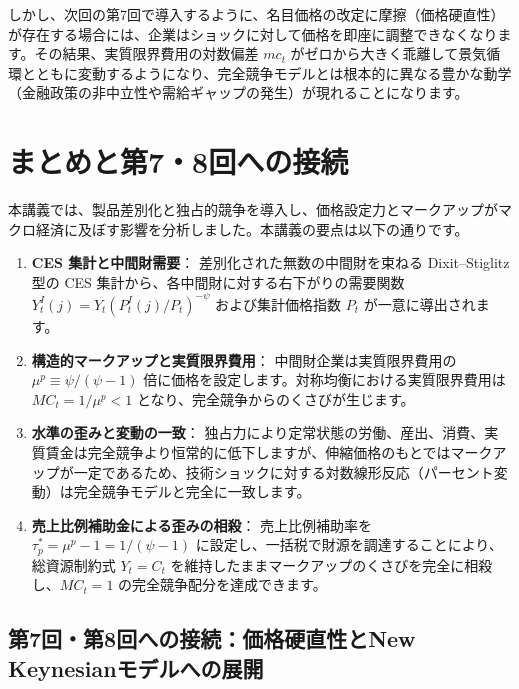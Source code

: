 \documentclass[
  japanese,
  lualatex,
  ja=standard,
  12pt,
  a4paper]{ltjsarticle}
\providecommand{\tightlist}{%
  \setlength{\itemsep}{0pt}\setlength{\parskip}{0pt}}
\begin{document}
しかし、次回の第7回で導入するように、名目価格の改定に摩擦（価格硬直性）が存在する場合には、企業はショックに対して価格を即座に調整できなくなります。その結果、実質限界費用の対数偏差
\(mc_t\)
がゼロから大きく乖離して景気循環とともに変動するようになり、完全競争モデルとは根本的に異なる豊かな動学（金融政策の非中立性や需給ギャップの発生）が現れることになります。

\section{まとめと第7・8回への接続}\label{ux307eux3068ux3081ux3068ux7b2c78ux56deux3078ux306eux63a5ux7d9a}

本講義では、製品差別化と独占的競争を導入し、価格設定力とマークアップがマクロ経済に及ぼす影響を分析しました。本講義の要点は以下の通りです。

\begin{enumerate}
\def\labelenumi{\arabic{enumi}.}
\tightlist
\item
  \textbf{CES 集計と中間財需要}： 差別化された無数の中間財を束ねる
  Dixit--Stiglitz 型の CES 集計から、各中間財に対する右下がりの需要関数
  \(Y_t^I(j) = Y_t (P_t^I(j)/P_t)^{-\psi}\) および集計価格指数 \(P_t\)
  が一意に導出されます。
\item
  \textbf{構造的マークアップと実質限界費用}： 中間財企業は実質限界費用の
  \(\mu^p \equiv \psi/(\psi-1)\)
  倍に価格を設定します。対称均衡における実質限界費用は
  \(MC_t = 1/\mu^p < 1\) となり、完全競争からのくさびが生じます。
\item
  \textbf{水準の歪みと変動の一致}：
  独占力により定常状態の労働、産出、消費、実質賃金は完全競争より恒常的に低下しますが、伸縮価格のもとではマークアップが一定であるため、技術ショックに対する対数線形反応（パーセント変動）は完全競争モデルと完全に一致します。
\item
  \textbf{売上比例補助金による歪みの相殺}： 売上比例補助率を
  \(\tau_p^* = \mu^p - 1 = 1/(\psi-1)\)
  に設定し、一括税で財源を調達することにより、総資源制約式 \(Y_t = C_t\)
  を維持したままマークアップのくさびを完全に相殺し、\(MC_t = 1\)
  の完全競争配分を達成できます。
\end{enumerate}

\subsection{第7回・第8回への接続：価格硬直性とNew
Keynesianモデルへの展開}\label{ux7b2c7ux56deux7b2c8ux56deux3078ux306eux63a5ux7d9aux4fa1ux683cux786cux76f4ux6027ux3068new-keynesianux30e2ux30c7ux30ebux3078ux306eux5c55ux958b}
\end{document}
